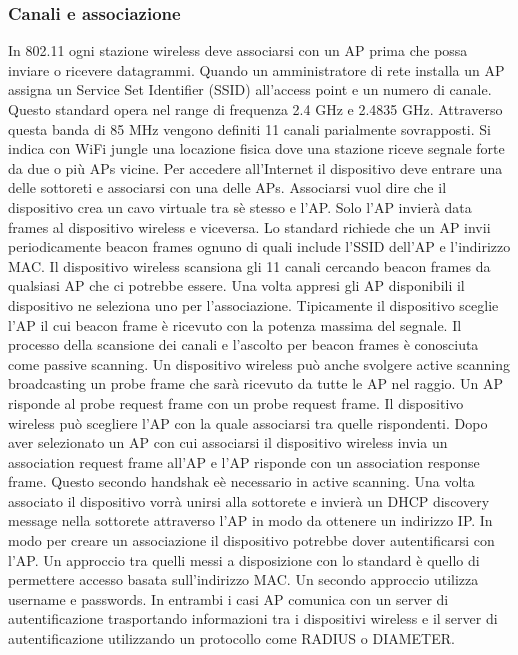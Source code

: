 \subsubsection{Canali e associazione}
In 802.11 ogni stazione wireless deve associarsi con un AP prima che possa inviare o ricevere datagrammi. Quando un amministratore di rete installa un AP assigna un Service Set Identifier (SSID) all'access 
point e un numero di canale. Questo standard opera nel range di frequenza 2.4 GHz e 2.4835 GHz. Attraverso questa banda di 85 MHz vengono definiti 11 canali parialmente sovrapposti. Si indica con
WiFi jungle una locazione fisica dove una stazione riceve segnale forte da due o pi\`u APs vicine. Per accedere all'Internet il dispositivo deve entrare una delle sottoreti e associarsi con una delle APs. Associarsi
vuol dire che il dispositivo crea un cavo virtuale tra s\`e stesso e l'AP. Solo l'AP invier\`a data frames al dispositivo wireless e viceversa. Lo standard richiede che un AP invii periodicamente beacon frames ognuno 
di quali include l'SSID dell'AP e l'indirizzo MAC. Il dispositivo wireless scansiona gli 11 canali cercando beacon frames da qualsiasi AP che ci potrebbe essere. Una volta appresi gli AP disponibili il dispositivo ne
seleziona uno per l'associazione. Tipicamente il dispositivo sceglie l'AP il cui beacon frame \`e ricevuto con la potenza massima del segnale. Il processo della scansione dei canali e l'ascolto per beacon frames \`e
conosciuta come passive scanning. Un dispositivo wireless pu\`o anche svolgere active scanning broadcasting un probe frame che sar\`a ricevuto da tutte le AP nel raggio. Un AP risponde al probe request frame
con un probe request frame. Il dispositivo wireless pu\`o scegliere l'AP con la quale associarsi tra quelle rispondenti. Dopo aver selezionato un AP con cui associarsi il dispositivo wireless invia un association 
request frame all'AP e l'AP risponde con un association response frame. Questo secondo handshak e\`e necessario in active scanning. Una volta associato il dispositivo vorr\`a unirsi alla sottorete e invier\`a
un DHCP discovery message nella sottorete attraverso l'AP in modo da ottenere un indirizzo IP. In modo per creare un associazione il dispositivo potrebbe dover autentificarsi con l'AP. Un approccio tra quelli
messi a disposizione con lo standard \`e quello di permettere accesso basata sull'indirizzo MAC. Un secondo approccio utilizza username e passwords. In entrambi i casi AP comunica con un server di 
autentificazione trasportando informazioni tra i dispositivi wireless e il server di autentificazione utilizzando un protocollo come RADIUS o DIAMETER.
